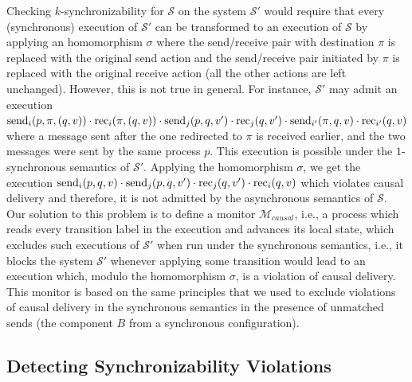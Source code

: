 Checking $k$-synchronizability for $\mathcal{S}$ on the system $\mathcal{S'}$ would require that every (synchronous) execution of $\mathcal{S'}$ can be transformed to an execution of $\mathcal{S}$ by applying an homomorphism $\sigma$ where the send/receive pair with destination $\pi$ is replaced with the original send action and the send/receive pair initiated by $\pi$ is replaced with the original receive action (all the other actions are left unchanged). However, this is not true in general. For instance, $\mathcal{S'}$ may admit an execution 
$
\mathrm{send}_{i}({p,\pi,(q,v)})\cdot \mathrm{rec}_{i}({\pi,(q,v)})\cdot \mathrm{send}_{j}({p,q,v'})\cdot \mathrm{rec}_{j}({q,v'})\cdot \mathrm{send}_{i'}({\pi,q,v})\cdot \mathrm{rec}_{i'}({q,v})
$
where a message sent after the one redirected to $\pi$ is received earlier, and the two messages were sent by the same process $p$. This execution is possible under the $1$-synchronous semantics of $\mathcal{S'}$. Applying the homomorphism $\sigma$, we get the execution 
$
\mathrm{send}_{i}({p,q,v})\cdot \mathrm{send}_{j}({p,q,v'})\cdot \mathrm{rec}_{j}({q,v'})\cdot \mathrm{rec}_{i}({q,v})
$
which violates causal delivery and therefore, it is not admitted by the asynchronous semantics of $\mathcal{S}$.
Our solution to this problem is to define a monitor $\mathcal{M}_{\mathit{causal}}$, i.e., a process which reads every transition label in the execution and advances its local state, which excludes such executions of $\mathcal{S}'$ when run under the synchronous semantics, i.e., it blocks the system $\mathcal{S}'$ whenever applying some transition would lead to an execution which, modulo the homomorphism $\sigma$, is a violation of causal delivery. This monitor is based on the same principles that we used to exclude violations of causal delivery in the synchronous semantics in the presence of unmatched sends (the component $B$ from a synchronous configuration). 


\vspace{-1mm}

\subsection{Detecting Synchronizability Violations}\label{ssec:verif4}

